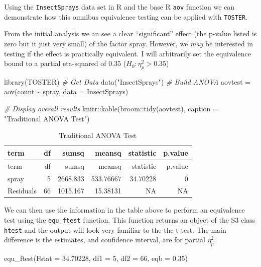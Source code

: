 \documentclass[]{interact}
\theoremstyle{plain}%
\theoremstyle{definition}
\theoremstyle{remark}
\newenvironment{Shaded}{\begin{snugshade}}{\end{snugshade}}
\newcommand{\AttributeTok}[1]{\textcolor[rgb]{0.77,0.63,0.00}{#1}}
\newcommand{\CommentTok}[1]{\textcolor[rgb]{0.56,0.35,0.01}{\textit{#1}}}
\newcommand{\DecValTok}[1]{\textcolor[rgb]{0.00,0.00,0.81}{#1}}
\newcommand{\FloatTok}[1]{\textcolor[rgb]{0.00,0.00,0.81}{#1}}
\newcommand{\FunctionTok}[1]{\textcolor[rgb]{0.00,0.00,0.00}{#1}}
\newcommand{\NormalTok}[1]{#1}
\newcommand{\OtherTok}[1]{\textcolor[rgb]{0.56,0.35,0.01}{#1}}
\newcommand{\SpecialCharTok}[1]{\textcolor[rgb]{0.00,0.00,0.00}{#1}}
\newcommand{\StringTok}[1]{\textcolor[rgb]{0.31,0.60,0.02}{#1}}
\begin{document}
Using the \texttt{InsectSprays} data set in R and the base R
\texttt{aov} function we can demonstrate how this omnibus equivalence
testing can be applied with \texttt{TOSTER}.

From the initial analysis we an see a clear ``significant'' effect (the
p-value listed is zero but it just very small) of the factor spray.
However, we \emph{may} be interested in testing if the effect is
practically equivalent. I will arbitrarily set the equivalence bound to
a partial eta-squared of 0.35 (\(H_0: \eta^2_p > 0.35\))

\begin{Shaded}
\begin{Highlighting}[]
\FunctionTok{library}\NormalTok{(TOSTER)}
\CommentTok{\# Get Data}
\FunctionTok{data}\NormalTok{(}\StringTok{"InsectSprays"}\NormalTok{)}
\CommentTok{\# Build ANOVA}
\NormalTok{aovtest }\OtherTok{=} \FunctionTok{aov}\NormalTok{(count }\SpecialCharTok{\textasciitilde{}}\NormalTok{ spray,}
              \AttributeTok{data =}\NormalTok{ InsectSprays)}

\CommentTok{\# Display overall results}
\NormalTok{knitr}\SpecialCharTok{::}\FunctionTok{kable}\NormalTok{(broom}\SpecialCharTok{::}\FunctionTok{tidy}\NormalTok{(aovtest),}
            \AttributeTok{caption =} \StringTok{"Traditional ANOVA Test"}\NormalTok{)}
\end{Highlighting}
\end{Shaded}

\begin{longtable}[]{@{}lrrrrr@{}}
\caption{Traditional ANOVA Test}\tabularnewline
\toprule()
term & df & sumsq & meansq & statistic & p.value \\
\midrule()
\endfirsthead
\toprule()
term & df & sumsq & meansq & statistic & p.value \\
\midrule()
\endhead
spray & 5 & 2668.833 & 533.76667 & 34.70228 & 0 \\
Residuals & 66 & 1015.167 & 15.38131 & NA & NA \\
\bottomrule()
\end{longtable}

We can then use the information in the table above to perform an
equivalence test using the \texttt{equ\_ftest} function. This function
returns an object of the S3 class \texttt{htest} and the output will
look very familiar to the the t-test. The main difference is the
estimates, and confidence interval, are for partial \(\eta^2_p\).

\begin{Shaded}
\begin{Highlighting}[]
\FunctionTok{equ\_ftest}\NormalTok{(}\AttributeTok{Fstat =} \FloatTok{34.70228}\NormalTok{,}
          \AttributeTok{df1 =} \DecValTok{5}\NormalTok{,}
          \AttributeTok{df2 =} \DecValTok{66}\NormalTok{,}
          \AttributeTok{eqb =} \FloatTok{0.35}\NormalTok{)}
\end{Highlighting}
\end{Shaded}
\end{document}
